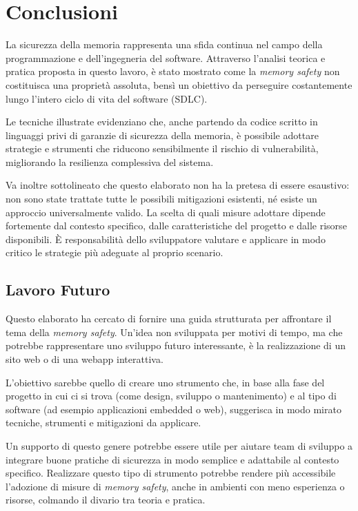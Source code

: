 \chapter{Conclusioni}
\label{cha:conclusioni}

La sicurezza della memoria rappresenta una sfida continua nel campo della
programmazione e dell'ingegneria del software. Attraverso l'analisi teorica e pratica
proposta in questo lavoro, è stato mostrato come la \textit{memory safety} non costituisca
una proprietà assoluta, bensì un obiettivo da perseguire costantemente lungo l'intero
ciclo di vita del software (SDLC).

Le tecniche illustrate evidenziano che, anche partendo da codice scritto in linguaggi
privi di garanzie di sicurezza della memoria, è possibile adottare strategie e
strumenti che riducono sensibilmente il rischio di vulnerabilità, migliorando la
resilienza complessiva del sistema.

Va inoltre sottolineato che questo elaborato non ha la pretesa di essere esaustivo:
non sono state trattate tutte le possibili mitigazioni esistenti, né esiste un approccio
universalmente valido. La scelta di quali misure adottare dipende fortemente dal
contesto specifico, dalle caratteristiche del progetto e dalle risorse disponibili.
È responsabilità dello sviluppatore valutare e applicare in modo critico le
strategie più adeguate al proprio scenario.

\section{Lavoro Futuro}
\label{sec:lavoro_futuro}

Questo elaborato ha cercato di fornire una guida strutturata per affrontare il tema
della \textit{memory safety}. Un'idea non sviluppata per motivi di tempo, ma che
potrebbe rappresentare uno sviluppo futuro interessante, è la realizzazione di un
sito web o di una webapp interattiva.

L'obiettivo sarebbe quello di creare uno strumento che, in base alla fase del
progetto in cui ci si trova (come design, sviluppo o mantenimento) e al tipo di software
(ad esempio applicazioni embedded o web), suggerisca in modo mirato tecniche, strumenti
e mitigazioni da applicare.

Un supporto di questo genere potrebbe essere utile per aiutare team di sviluppo a
integrare buone pratiche di sicurezza in modo semplice e adattabile al contesto specifico.
Realizzare questo tipo di strumento potrebbe rendere più accessibile l'adozione
di misure di \textit{memory safety}, anche in ambienti con meno esperienza o
risorse, colmando il divario tra teoria e pratica.